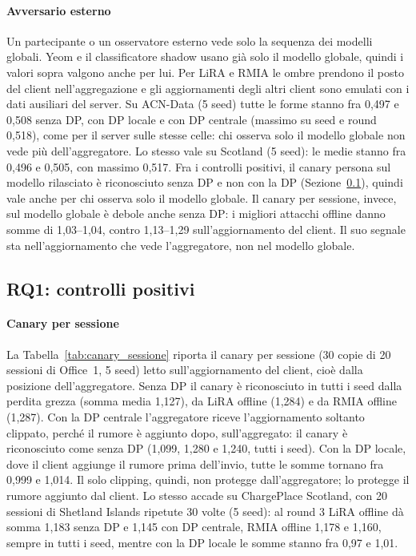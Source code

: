 \paragraph{Avversario esterno}
Un partecipante o un osservatore esterno vede solo la sequenza dei modelli globali. Yeom e il
classificatore shadow usano già solo il modello globale, quindi i valori sopra valgono anche per
lui. Per LiRA e RMIA le ombre prendono il posto del client nell'aggregazione e gli aggiornamenti
degli altri client sono emulati con i dati ausiliari del server. Su ACN-Data (5 seed) tutte le
forme stanno fra 0,497 e 0,508 senza DP, con DP locale e con DP centrale (massimo su seed e round
0,518), come per il server sulle stesse celle: chi osserva solo il modello globale non vede più
dell'aggregatore. Lo stesso vale su Scotland (5 seed): le medie stanno fra 0,496 e 0,505, con
massimo 0,517. Fra i controlli positivi, il canary persona sul modello rilasciato è riconosciuto
senza DP e non con la DP (Sezione~\ref{subsec:res_canary}), quindi vale anche per chi osserva solo
il modello globale. Il canary per sessione, invece, sul modello globale è debole anche senza DP: i
migliori attacchi offline danno somme di 1,03--1,04, contro 1,13--1,29 sull'aggiornamento del
client. Il suo segnale sta nell'aggiornamento che vede l'aggregatore, non nel modello globale.

\subsection{RQ1: controlli positivi}
\label{subsec:res_canary}

\paragraph{Canary per sessione}
La Tabella~\ref{tab:canary_sessione} riporta il canary per sessione (30 copie di 20 sessioni
di Office~1, 5 seed) letto sull'aggiornamento del client, cioè dalla posizione
dell'aggregatore. Senza DP il canary è riconosciuto in tutti i seed dalla perdita grezza
(somma media 1,127), da LiRA offline (1,284) e da RMIA offline (1,287). Con la DP centrale
l'aggregatore riceve l'aggiornamento soltanto clippato, perché il rumore è aggiunto dopo,
sull'aggregato: il canary è riconosciuto come senza DP (1,099, 1,280 e 1,240, tutti i seed).
Con la DP locale, dove il client aggiunge il rumore prima dell'invio, tutte le somme tornano
fra 0,999 e 1,014. Il solo clipping, quindi, non protegge dall'aggregatore; lo protegge il
rumore aggiunto dal client. Lo stesso accade su ChargePlace Scotland, con 20 sessioni di Shetland
Islands ripetute 30 volte (5 seed): al round 3 LiRA offline dà somma 1,183 senza DP e 1,145 con DP
centrale, RMIA offline 1,178 e 1,160, sempre in tutti i seed, mentre con la DP locale le somme
stanno fra 0,97 e 1,01.

